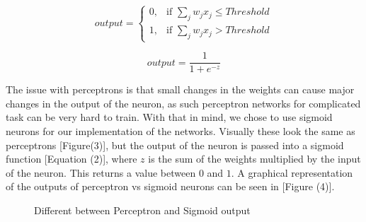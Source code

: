 \documentclass{sig-alternate-05-2015}
\begin{document}
\begin{equation}
output =
\left\{
	\begin{array}{ll}
		0, & \mbox{if } \sum_j  w_j x_j \leq Threshold \\
		1, & \mbox{if } \sum_j  w_j x_j > Threshold
	\end{array}
\right.
\end{equation}

\begin{equation}
output = \frac{1}{1+e^{-z}}
\end{equation}



	
	The issue with perceptrons is that small changes in the weights can cause major changes in the output of the neuron, as such perceptron networks for complicated task can be very hard to train. With that in mind, we chose to use sigmoid neurons for our implementation of the networks. Visually these look the same as perceptrons [Figure(3)], but the output of the neuron is passed into a sigmoid function [Equation (2)], where $z$ is the sum of the weights multiplied by the input of the neuron. This returns a value between $0$ and $1$. A graphical representation of the outputs of perceptron vs sigmoid neurons can be seen in [Figure (4)].
	
\begin{figure}[h!]
\centering
{}
\caption{Different between Perceptron and Sigmoid output}
\label{fig:graph5}
\end{figure}
	
\end{document}
